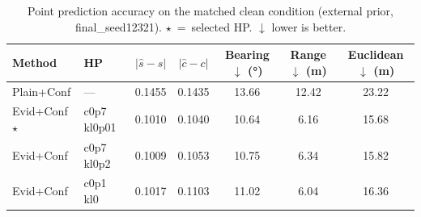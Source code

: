 \begin{table}[t]
\centering
\caption{Point prediction accuracy on the matched clean condition (external prior, final_seed12321). $\star$~=~selected HP. $\downarrow$ lower is better.}
\label{tab:accuracy_final_seed12321}
\begin{tabular}{llccccc}
\toprule
Method & HP & $|\hat{s}-s|$ & $|\hat{c}-c|$ & Bearing$\downarrow$ (°) & Range$\downarrow$ (m) & Euclidean$\downarrow$ (m) \\
\midrule
Plain+Conf & — & 0.1455 & 0.1435 & 13.66 & 12.42 & 23.22 \\
Evid+Conf $\star$ & c0p7 kl0p01 & 0.1010 & 0.1040 & 10.64 & 6.16 & 15.68 \\
Evid+Conf & c0p7 kl0p2 & 0.1009 & 0.1053 & 10.75 & 6.34 & 15.82 \\
Evid+Conf & c0p1 kl0 & 0.1017 & 0.1103 & 11.02 & 6.04 & 16.36 \\
\bottomrule
\end{tabular}
\end{table}